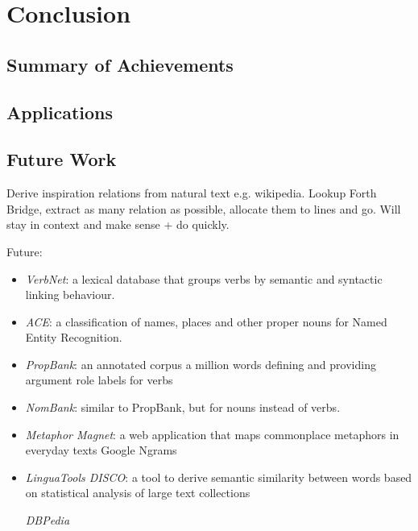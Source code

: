 \def\baselinestretch{1}
\chapter{Conclusion}
\ifpdf
    \graphicspath{{Conclusions/ConclusionsFigs/PNG/}{Conclusions/ConclusionsFigs/PDF/}{Conclusions/ConclusionsFigs/}}
\else
    \graphicspath{{Conclusions/ConclusionsFigs/EPS/}{Conclusions/ConclusionsFigs/}}
\fi

\def\baselinestretch{1.66}


\section{Summary of Achievements}

\section{Applications}

\section{Future Work}

Derive inspiration relations from natural text e.g. wikipedia. Lookup Forth Bridge, extract as many relation as possible, allocate them to lines and go. Will stay in context and make sense + do quickly.


Future:
\begin{itemize}
\item{\textit{VerbNet}: a lexical database that groups verbs by semantic and syntactic linking behaviour.\cite{schuler2005verbnet}}
\item{\textit{ACE}: a classification of names, places and other proper nouns for Named Entity Recognition.\cite{doddington2004automatic}}
\item{\textit{PropBank}: an annotated corpus a million words defining and providing argument role labels for verbs\cite{kingsbury2002treebank}}
\item{\textit{NomBank}: similar to PropBank, but for nouns instead of verbs.\cite{meyers2004nombank}}
\item{\textit{Metaphor Magnet}: a web application that maps commonplace metaphors in everyday texts\cite{vealespecifying}}
Google Ngrams
\item{\textit{LinguaTools DISCO}: a tool to derive semantic similarity between words based on statistical analysis of large text collections\cite{kolb2008disco}}

\textit{DBPedia}
\end{itemize}

